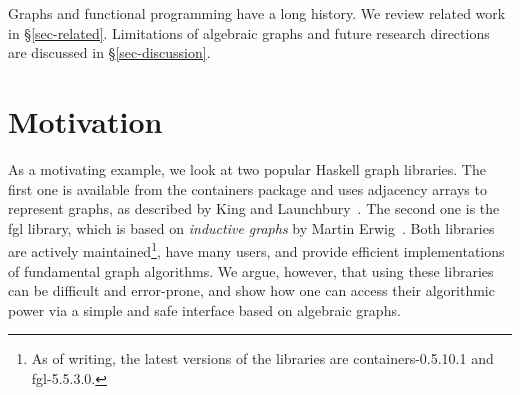 \documentclass[acmlarge,anonymous]{acmart}\settopmatter{printfolios=true}
\begin{document}
Graphs and functional programming have a long history. We review related
work in \S\ref{sec-related}. Limitations of algebraic graphs and future
research directions are discussed in \S\ref{sec-discussion}.

\section{Motivation}\label{sec-motivation}

As a motivating
example, we look at two popular Haskell graph libraries. The first one is
available from the \textsf{containers} package and uses adjacency arrays
to represent graphs,
as described by King and Launchbury~\citeyear{1995_king_graphs}. The second one
is the \textsf{fgl} library, which is based on \emph{inductive graphs}
by Martin Erwig~\citeyear{2001_erwig_inductive}. Both libraries are
actively maintained\footnote{As of writing, the latest versions of the libraries
are \textsf{containers-0.5.10.1} and \textsf{fgl-5.5.3.0}.},
have many users, and provide efficient implementations of
fundamental graph algorithms. We argue, however, that using these libraries
can be difficult and error-prone, and show how one can access their algorithmic
power via a simple and safe interface based on algebraic graphs.
\end{document}
